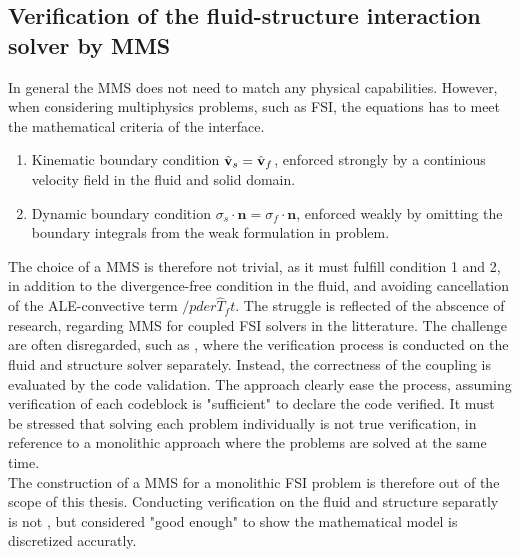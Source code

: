 \subsection{Verification of the fluid-structure interaction solver by MMS}
In general the MMS does not need to match any physical capabilities. However, when considering multiphysics problems, such as FSI, the equations has to meet the mathematical criteria of the interface.
\begin{enumerate}
\item Kinematic boundary condition $\hat{\mathbf{v}}_s = \hat{\mathbf{v}}_f$, enforced strongly by a continious velocity field in the fluid
        and solid domain.
\item Dynamic boundary condition $\sigma_s \cdot \mathbf{n}= \sigma_f \cdot \mathbf{n}$, enforced weakly by omitting the 
        boundary integrals from the weak formulation in problem.
\end{enumerate}
The choice of a MMS is therefore not trivial, as it must fulfill condition 1 and 2, in addition to the divergence-free condition in the fluid, and avoiding cancellation of the ALE-convective term $/pder{\hat{T}_f}{t}$.  The struggle is reflected of the abscence of research, regarding MMS for coupled FSI solvers in the litterature. The challenge are often disregarded, such as \cite{Sheldon2014}, where the verification process is conducted on the fluid and structure solver separately. Instead, the correctness of the coupling is evaluated by the code validation. The approach clearly ease the process, assuming verification of each codeblock is "sufficient" to declare the code verified. It must be stressed that solving each problem individually is not true verification, in reference to a monolithic approach where the problems are solved at the same time.\\The construction of a MMS for a monolithic FSI problem is therefore out of the scope of this thesis. Conducting verification on the fluid and structure separatly is not , but considered "good enough" to show the mathematical model is discretized accuratly.

